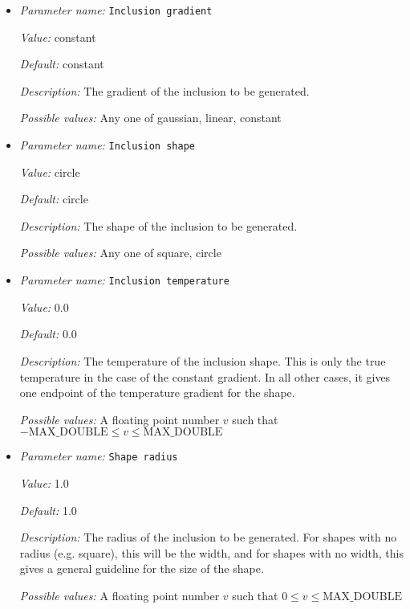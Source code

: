 \begin{itemize}
{\it Possible values:} A floating point number $v$ such that $-\text{MAX\_DOUBLE} \leq v \leq \text{MAX\_DOUBLE}$
\item {\it Parameter name:} {\tt Inclusion gradient}
\label{parameters:Initial temperature model/Inclusion shape perturbation/Inclusion gradient}


{\it Value:} constant


{\it Default:} constant


{\it Description:} The gradient of the inclusion to be generated.


{\it Possible values:} Any one of gaussian, linear, constant
\item {\it Parameter name:} {\tt Inclusion shape}
\label{parameters:Initial temperature model/Inclusion shape perturbation/Inclusion shape}


{\it Value:} circle


{\it Default:} circle


{\it Description:} The shape of the inclusion to be generated.


{\it Possible values:} Any one of square, circle
\item {\it Parameter name:} {\tt Inclusion temperature}
\label{parameters:Initial temperature model/Inclusion shape perturbation/Inclusion temperature}


{\it Value:} 0.0


{\it Default:} 0.0


{\it Description:} The temperature of the inclusion shape. This is only the true temperature in the case of the constant gradient. In all other cases, it gives one endpoint of the temperature gradient for the shape.


{\it Possible values:} A floating point number $v$ such that $-\text{MAX\_DOUBLE} \leq v \leq \text{MAX\_DOUBLE}$
\item {\it Parameter name:} {\tt Shape radius}
\label{parameters:Initial temperature model/Inclusion shape perturbation/Shape radius}


{\it Value:} 1.0


{\it Default:} 1.0


{\it Description:} The radius of the inclusion to be generated. For shapes with no radius (e.g. square), this will be the width, and for shapes with no width, this gives a general guideline for the size of the shape.


{\it Possible values:} A floating point number $v$ such that $0 \leq v \leq \text{MAX\_DOUBLE}$
\end{itemize}

